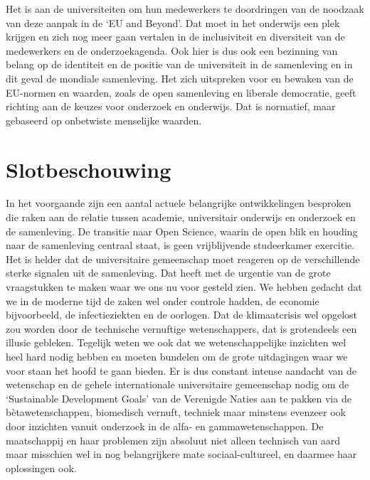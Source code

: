 \documentclass{jote-book}
\begin{document}
	Het is aan de universiteiten om hun medewerkers te doordringen van de noodzaak van deze aanpak in de ‘EU and Beyond'. Dat moet in het onderwijs een plek krijgen en zich nog meer gaan vertalen in de inclusiviteit en diversiteit van de medewerkers en de onderzoekagenda. Ook hier is dus ook een bezinning van belang op de identiteit en de positie van de universiteit in de samenleving en in dit geval de mondiale samenleving. Het zich uitspreken voor en bewaken van de EU-normen en waarden, zoals de open samenleving en liberale democratie, geeft richting aan de keuzes voor onderzoek en onderwijs. Dat is normatief, maar gebaseerd op onbetwiste menselijke waarden.



	\section{Slotbeschouwing}



	In het voorgaande zijn een aantal actuele belangrijke ontwikkelingen besproken die raken aan de relatie tussen academie, universitair onderwijs en onderzoek en de samenleving. De transitie naar Open Science, waarin de open blik en houding naar de samenleving centraal staat, is geen vrijblijvende studeerkamer exercitie. Het is helder dat de universitaire gemeenschap moet reageren op de verschillende sterke signalen uit de samenleving. Dat heeft met de urgentie van de grote vraagstukken te maken waar we ons nu voor gesteld zien. We hebben gedacht dat we in de moderne tijd de zaken wel onder controle hadden, de economie bijvoorbeeld, de infectieziekten en de oorlogen. Dat de klimaatcrisis wel opgelost zou worden door de technische vernuftige wetenschappers, dat is grotendeels een illusie gebleken. Tegelijk weten we ook dat we wetenschappelijke inzichten wel heel hard nodig hebben en moeten bundelen om de grote uitdagingen waar we voor staan het hoofd te gaan bieden. Er is dus constant intense aandacht van de wetenschap en de gehele internationale universitaire gemeenschap nodig om de ‘Sustainable Development Goals' van de Verenigde Naties aan te pakken via de bètawetenschappen, biomedisch vernuft, techniek maar minstens evenzeer ook door inzichten vanuit onderzoek in de alfa- en gammawetenschappen. De maatschappij en haar problemen zijn absoluut niet alleen technisch van aard maar misschien wel in nog belangrijkere mate sociaal-cultureel, en daarmee haar oplossingen ook.
\end{document}
